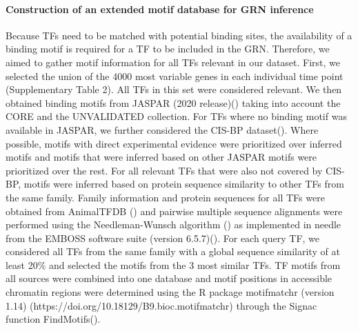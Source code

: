 \paragraph{Construction of an extended motif database for GRN inference}
Because TFs need to be matched with potential binding sites, the availability of a binding motif is required for a TF to be included in the GRN. Therefore, we aimed to gather motif information for all TFs relevant in our dataset. First, we selected the union of the 4000 most variable genes in each individual time point (Supplementary Table 2). All TFs in this set were considered relevant. We then obtained binding motifs from JASPAR (2020 release)(\cite{fornes_jaspar_2020}) taking into account the CORE and the UNVALIDATED collection. For TFs where no binding motif was available in JASPAR, we further considered the CIS-BP dataset(\cite{weirauch_determination_2014}). Where possible, motifs with direct experimental evidence were prioritized over inferred motifs and motifs that were inferred based on other JASPAR motifs were prioritized over the rest. For all relevant TFs that were also not covered by CIS-BP, motifs were inferred based on protein sequence similarity to other TFs from the same family. Family information and protein sequences for all TFs were obtained from AnimalTFDB (\cite{hu_animaltfdb_2019}) and pairwise multiple sequence alignments were performed using the Needleman-Wunsch algorithm (\cite{needleman_general_1970}) as implemented in needle from the EMBOSS software suite (version 6.5.7)(\cite{rice_emboss_2000}). For each query TF, we considered all TFs from the same family with a global sequence similarity of at least 20\% and selected the motifs from the 3 most similar TFs. TF motifs from all sources were combined into one database and motif positions in accessible chromatin regions were determined using the R package motifmatchr (version 1.14) (https://doi.org/10.18129/B9.bioc.motifmatchr) through the Signac function FindMotifs().
 
